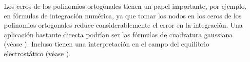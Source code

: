 Los ceros de los polinomios ortogonales tienen un papel importante, por ejemplo, en fórmulas de integración numérica, ya que tomar los nodos en los ceros de los polinomios ortogonales reduce considerablemente el error en la integración. Una aplicación bastante directa podrían ser las fórmulas de cuadratura gaussiana (véase \cite[Ch. I, Sección 6]{chihara}). Incluso tienen una interpretación en el campo del equilibrio electrostático (véase \cite{Steinerberger}).